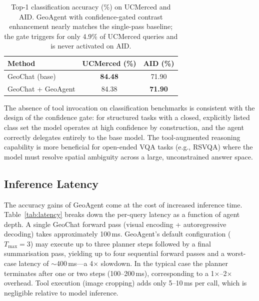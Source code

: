 \documentclass{article}
\begin{document}
\begin{table}[t]
  \caption{Top-1 classification accuracy (\%) on UCMerced and AID.  GeoAgent
    with confidence-gated contrast enhancement nearly matches the single-pass
    baseline; the gate triggers for only 4.9\% of UCMerced queries and
    is never activated on AID.}
  \label{tab:cls}
  \centering
  \begin{tabular}{lcc}
    \toprule
    \textbf{Method} & \textbf{UCMerced (\%)} & \textbf{AID (\%)} \\
    \midrule
    GeoChat (base)     & \textbf{84.48} & 71.90 \\
    GeoChat + GeoAgent & 84.38          & \textbf{71.90} \\
    \bottomrule
  \end{tabular}
\end{table}

The absence of tool invocation on classification benchmarks is consistent with
the design of the confidence gate: for structured tasks with a closed, explicitly
listed class set the model operates at high confidence by construction, and the
agent correctly delegates entirely to the base model.  The tool-augmented
reasoning capability is more beneficial for open-ended VQA tasks (e.g., RSVQA)
where the model must resolve spatial ambiguity across a large, unconstrained
answer space.

\subsection{Inference Latency}

The accuracy gains of GeoAgent come at the cost of increased inference time.
Table~\ref{tab:latency} breaks down the per-query latency as a function of agent
depth.  A single GeoChat forward pass (visual encoding + autoregressive decoding)
takes approximately 100\,ms.  GeoAgent's default configuration ($T_{\max}=3$) may
execute up to three planner steps followed by a final summarisation pass, yielding
up to four sequential forward passes and a worst-case latency of
$\sim$400\,ms---a 4$\times$ slowdown.  In the typical case the planner terminates
after one or two steps (100--200\,ms), corresponding to a 1$\times$--2$\times$
overhead.  Tool execution (image cropping) adds only 5--10\,ms per call, which is
negligible relative to model inference.
\end{document}
